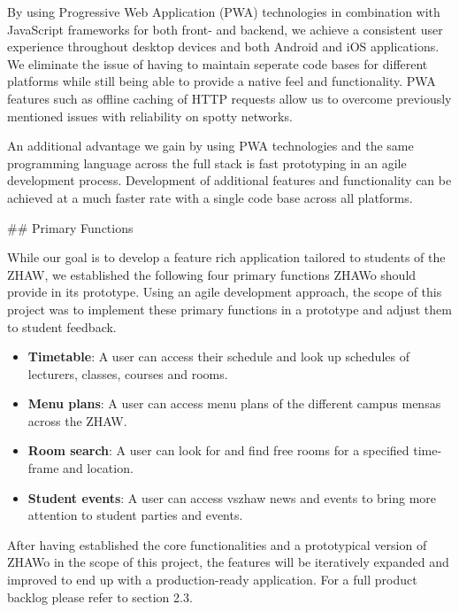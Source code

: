\begin{markdown}
By using Progressive Web Application (PWA) technologies \cite{PWA} in combination with JavaScript frameworks for both front- and backend, we achieve a consistent user experience throughout desktop devices and both Android and iOS applications. We eliminate the issue of having to maintain seperate code bases for different platforms while still being able to provide a native feel and functionality. PWA features such as offline caching of HTTP requests allow us to overcome previously mentioned issues with reliability on spotty networks.

An additional advantage we gain by using PWA technologies and the same programming language across the full stack is fast prototyping in an agile development process. Development of additional features and functionality can be achieved at a much faster rate with a single code base across all platforms.

\newpage

## Primary Functions

While our goal is to develop a feature rich application tailored to students of the ZHAW, we established the following four primary functions ZHAWo should provide in its prototype. Using an agile development approach, the scope of this project was to implement these primary functions in a prototype and adjust them to student feedback.

\begin{itemize}
  \item \textbf{Timetable}: A user can access their schedule and look up schedules of lecturers, classes, courses and rooms.
  \item \textbf{Menu plans}: A user can access menu plans of the different campus mensas across the ZHAW.
  \item \textbf{Room search}: A user can look for and find free rooms for a specified time-frame and location.
  \item \textbf{Student events}: A user can access vszhaw news and events to bring more attention to student parties and events.
\end{itemize}

After having established the core functionalities and a prototypical version of ZHAWo in the scope of this project, the features will be iteratively expanded and improved to end up with a production-ready application. For a full product backlog please refer to section 2.3.

\end{markdown}
